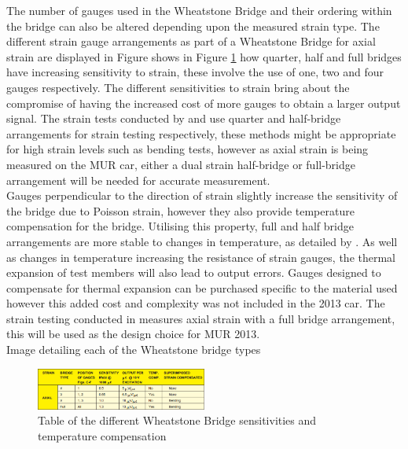The number of gauges used in the Wheatstone Bridge and their ordering within the bridge can also be altered depending upon the measured strain type. The different strain gauge arrangements as part of a Wheatstone Bridge for axial strain are displayed in Figure
\cite{Text_9} shows in Figure \ref{fig:IMG_SG_Wheatstone_Sens} how quarter, half and full bridges have increasing sensitivity to strain, these involve the use of one, two and four gauges respectively. The different sensitivities to strain bring about the compromise of having the increased cost of more gauges to obtain a larger output signal. The strain tests conducted by \cite{Text_1} and \cite{Text_2} use quarter and half-bridge arrangements for strain testing respectively, these methods might be appropriate for high strain levels such as bending tests, however as axial strain is being measured on the MUR car, either a dual strain half-bridge or full-bridge arrangement will be needed for accurate measurement.\\ 
Gauges perpendicular to the direction of strain slightly increase the sensitivity of the bridge due to Poisson strain, however they also provide temperature compensation for the bridge. Utilising this property, full and half bridge arrangements are more stable to changes in temperature, as detailed by \cite{Text_10}. As well as changes in temperature increasing the resistance of strain gauges, the thermal expansion of test members will also lead to output errors. Gauges designed to compensate for thermal expansion can be purchased specific to the material used \cite{Text_10} however this added cost and complexity was not included in the 2013 car. The strain testing conducted in \cite{Text_6} measures axial strain with a full bridge arrangement, this will be used as the design choice for MUR 2013.\\

Image detailing each of the Wheatstone bridge types


\begin{figure}[h!]
	\centering
	\includegraphics[width=0.5\textwidth]{Images/Strain_Gauges/IMG_SG_Wheatstone_Sens.png}	
	\caption{Table of the different Wheatstone Bridge sensitivities and temperature compensation \cite{Text_9}}
	\label{fig:IMG_SG_Wheatstone_Sens}
\end{figure}

